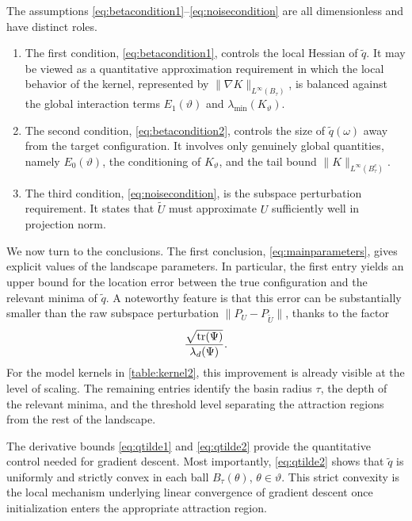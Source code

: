 \documentclass[11pt]{article}
\theoremstyle{definition}
\numberwithin{theorem}{section}
\numberwithin{lemma}{section}
\numberwithin{equation}{section}
\renewcommand{\tilde}{\widetilde}
\def\trace{{\rm tr}}
\numberwithin{equation}{section}
\begin{document}
The assumptions \eqref{eq:betacondition1}--\eqref{eq:noisecondition} are all dimensionless and have distinct roles.

\begin{enumerate}[1.]
\item
The first condition, \eqref{eq:betacondition1}, controls the local Hessian of $\tilde q$. It may be viewed as a quantitative approximation requirement in which the local behavior of the kernel, represented by $\|\nabla K\|_{L^\infty(B_\tau)}$, is balanced against the global interaction terms $E_1(\vartheta)$ and $\lambda_{\min}(K_\vartheta)$.

\item
The second condition, \eqref{eq:betacondition2}, controls the size of $\tilde q(\omega)$ away from the target configuration. It involves only genuinely global quantities, namely $E_0(\vartheta)$, the conditioning of $K_\vartheta$, and the tail bound $\|K\|_{L^\infty(B_\tau^c)}$.

\item
The third condition, \eqref{eq:noisecondition}, is the subspace perturbation requirement. It states that $\tilde U$ must approximate $U$ sufficiently well in projection norm.
\end{enumerate}

We now turn to the conclusions. The first conclusion, \eqref{eq:mainparameters}, gives explicit values of the landscape parameters. In particular, the first entry yields an upper bound for the location error between the true configuration and the relevant minima of $\tilde q$. A noteworthy feature is that this error can be substantially smaller than the raw subspace perturbation $\|P_U-P_{\tilde U}\|$, thanks to the factor
\[
\frac{\sqrt{\trace(\Psi)}}{\lambda_d(\Psi)}.
\]
For the model kernels in \cref{table:kernel2}, this improvement is already visible at the level of scaling. The remaining entries identify the basin radius $\tau$, the depth of the relevant minima, and the threshold level separating the attraction regions from the rest of the landscape.

The derivative bounds \eqref{eq:qtilde1} and \eqref{eq:qtilde2} provide the quantitative control needed for gradient descent. Most importantly, \eqref{eq:qtilde2} shows that $\tilde q$ is uniformly and strictly convex in each ball $B_\tau(\theta)$, $\theta\in\vartheta$. This strict convexity is the local mechanism underlying linear convergence of gradient descent once initialization enters the appropriate attraction region.
\end{document}

